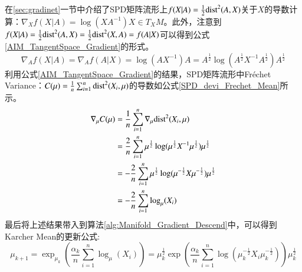 在\ref{sec:gradinet}一节中介绍了SPD矩阵流形上$f(X|A)=\frac{1}{2}{\rm dist}^{2}(A,X)$关于$X$的导数计算：$\nabla_X f(X|A)=\log(XA^{-1})X \in T_{X}M$。此外，注意到$f(X|A)=\frac{1}{2}{\rm dist}^{2}(A,X)=\frac{1}{2}{\rm dist}^{2}(X,A)=f(A|X)$可以得到公式\ref{AIM_TangentSpace_Gradient}的形式。
\begin{equation}
\label{AIM_TangentSpace_Gradient}
\nabla_A f(X|A)=\nabla_A f(A|X)=\log(AX^{-1})A=A^{\frac{1}{2}}\log(A^{\frac{1}{2}}X^{-1}A^{\frac{1}{2}})A^{\frac{1}{2}}
\end{equation}
利用公式\ref{AIM_TangentSpace_Gradient}的结果，SPD矩阵流形中Fr\'echet Variance：$C(\mu)=\frac{1}{n}\sum_{i=1}^{n}{\rm dist}^{2}(X_{i},\mu)$的导数如公式\ref{SPD_devi_Frechet_Mean}所示。
\begin{equation}
\label{SPD_devi_Frechet_Mean}
\begin{split}
\nabla_{\mu} C(\mu)&=\frac{1}{n}\sum_{i=1}^{n}\nabla_{\mu}{\rm dist}^{2}(X_{i},\mu)\\
&=\frac{2}{n}\sum_{i=1}^{n}{\mu}^{\frac{1}{2}}\log({\mu}^{\frac{1}{2}}X^{-1}{\mu}^{\frac{1}{2}}){\mu}^{\frac{1}{2}}\\
&=-\frac{2}{n}\sum_{i=1}^{n}{\mu}^{\frac{1}{2}}\log({\mu}^{-\frac{1}{2}}X{\mu}^{-\frac{1}{2}}){\mu}^{\frac{1}{2}}\\
&=-\frac{2}{n}\sum_{i=1}^{n}\log_{\mu}(X_{i})
\end{split}
\end{equation}
最后将上述结果带入到算法\ref{alg:Manifold_Gradient_Descend}中，可以得到Karcher Mean的更新公式:
\begin{equation}
\label{AIM_Karcher_Mean}
\mu_{k+1}=\exp_{\mu_{k}}(\frac{\alpha_{k}}{n}\sum_{i=1}^{n}\log_{\mu}(X_{i}))={\mu}^{\frac{1}{2}}_{k}\exp(\frac{\alpha_{k}}{n}\sum_{i=1}^{n}\log({\mu}^{-\frac{1}{2}}_{k}X_{i}{\mu}^{-\frac{1}{2}}_{k})){\mu}^{\frac{1}{2}}_{k}
\end{equation}

